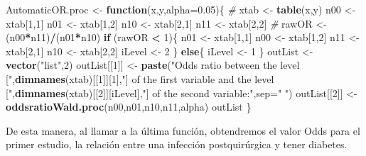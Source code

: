 \documentclass[]{article}
\newenvironment{Shaded}{\begin{snugshade}}{\end{snugshade}}
\newcommand{\CommentTok}[1]{\textcolor[rgb]{0.56,0.35,0.01}{\textit{#1}}}
\newcommand{\ControlFlowTok}[1]{\textcolor[rgb]{0.13,0.29,0.53}{\textbf{#1}}}
\newcommand{\DataTypeTok}[1]{\textcolor[rgb]{0.13,0.29,0.53}{#1}}
\newcommand{\DecValTok}[1]{\textcolor[rgb]{0.00,0.00,0.81}{#1}}
\newcommand{\FloatTok}[1]{\textcolor[rgb]{0.00,0.00,0.81}{#1}}
\newcommand{\KeywordTok}[1]{\textcolor[rgb]{0.13,0.29,0.53}{\textbf{#1}}}
\newcommand{\NormalTok}[1]{#1}
\newcommand{\OperatorTok}[1]{\textcolor[rgb]{0.81,0.36,0.00}{\textbf{#1}}}
\newcommand{\StringTok}[1]{\textcolor[rgb]{0.31,0.60,0.02}{#1}}
\begin{document}
\begin{Shaded}
\begin{Highlighting}[]
\NormalTok{AutomaticOR.proc <-}\StringTok{ }\ControlFlowTok{function}\NormalTok{(x,y,}\DataTypeTok{alpha=}\FloatTok{0.05}\NormalTok{)\{}
  \CommentTok{#}
\NormalTok{  xtab <-}\StringTok{ }\KeywordTok{table}\NormalTok{(x,y)}
\NormalTok{  n00 <-}\StringTok{ }\NormalTok{xtab[}\DecValTok{1}\NormalTok{,}\DecValTok{1}\NormalTok{]}
\NormalTok{  n01 <-}\StringTok{ }\NormalTok{xtab[}\DecValTok{1}\NormalTok{,}\DecValTok{2}\NormalTok{]}
\NormalTok{  n10 <-}\StringTok{ }\NormalTok{xtab[}\DecValTok{2}\NormalTok{,}\DecValTok{1}\NormalTok{]}
\NormalTok{  n11 <-}\StringTok{ }\NormalTok{xtab[}\DecValTok{2}\NormalTok{,}\DecValTok{2}\NormalTok{]}
  \CommentTok{#}
\NormalTok{  rawOR <-}\StringTok{ }\NormalTok{(n00}\OperatorTok{*}\NormalTok{n11)}\OperatorTok{/}\NormalTok{(n01}\OperatorTok{*}\NormalTok{n10)}
  \ControlFlowTok{if}\NormalTok{ (rawOR }\OperatorTok{<}\StringTok{ }\DecValTok{1}\NormalTok{)\{}
\NormalTok{    n01 <-}\StringTok{ }\NormalTok{xtab[}\DecValTok{1}\NormalTok{,}\DecValTok{1}\NormalTok{]}
\NormalTok{    n00 <-}\StringTok{ }\NormalTok{xtab[}\DecValTok{1}\NormalTok{,}\DecValTok{2}\NormalTok{]}
\NormalTok{    n11 <-}\StringTok{ }\NormalTok{xtab[}\DecValTok{2}\NormalTok{,}\DecValTok{1}\NormalTok{]}
\NormalTok{    n10 <-}\StringTok{ }\NormalTok{xtab[}\DecValTok{2}\NormalTok{,}\DecValTok{2}\NormalTok{]}
\NormalTok{    iLevel <-}\StringTok{ }\DecValTok{2}
\NormalTok{  \}}
  \ControlFlowTok{else}\NormalTok{\{}
\NormalTok{    iLevel <-}\StringTok{ }\DecValTok{1}
\NormalTok{  \}}
\NormalTok{  outList <-}\StringTok{ }\KeywordTok{vector}\NormalTok{(}\StringTok{"list"}\NormalTok{,}\DecValTok{2}\NormalTok{)}
\NormalTok{  outList[[}\DecValTok{1}\NormalTok{]] <-}\StringTok{ }\KeywordTok{paste}\NormalTok{(}\StringTok{"Odds ratio between the level ["}\NormalTok{,}\KeywordTok{dimnames}\NormalTok{(xtab)[[}\DecValTok{1}\NormalTok{]][}\DecValTok{1}\NormalTok{],}\StringTok{"] of the first variable and the level ["}\NormalTok{,}\KeywordTok{dimnames}\NormalTok{(xtab)[[}\DecValTok{2}\NormalTok{]][iLevel],}\StringTok{"] of the second variable:"}\NormalTok{,}\DataTypeTok{sep=}\StringTok{" "}\NormalTok{)}
\NormalTok{  outList[[}\DecValTok{2}\NormalTok{]] <-}\StringTok{ }\KeywordTok{oddsratioWald.proc}\NormalTok{(n00,n01,n10,n11,alpha)}
\NormalTok{  outList}
\NormalTok{\}}
\end{Highlighting}
\end{Shaded}

De esta manera, al llamar a la última función, obtendremos el valor Odds
para el primer estudio, la relación entre una infección postquirúrgica y
tener diabetes.
\end{document}
